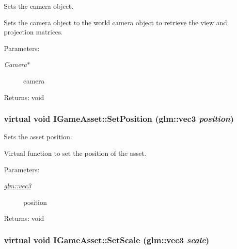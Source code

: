 Sets the camera object. 

Sets the camera object to the world camera object to retrieve the view and projection matrices.

\begin{Desc}
\item[Parameters:]
\begin{description}
\item[{\em Camera$\ast$}]camera \end{description}
\end{Desc}
\begin{Desc}
\item[Returns:]void \end{Desc}
\hypertarget{class_i_game_asset_2e98161443bb490819d97991f4dc662f}{
\subsubsection[SetPosition]{\setlength{\rightskip}{0pt plus 5cm}virtual void IGameAsset::SetPosition ({\bf glm::vec3} {\em position})}}
\label{class_i_game_asset_2e98161443bb490819d97991f4dc662f}


Sets the asset position. 

Virtual function to set the position of the asset.

\begin{Desc}
\item[Parameters:]
\begin{description}
\item[{\em \hyperlink{group__core__types_g1c47e8b3386109bc992b6c48e91b0be7}{glm::vec3}}]position \end{description}
\end{Desc}
\begin{Desc}
\item[Returns:]void \end{Desc}
\hypertarget{class_i_game_asset_bfda4878867c08bc8087c8fbe7336e54}{
\subsubsection[SetScale]{\setlength{\rightskip}{0pt plus 5cm}virtual void IGameAsset::SetScale ({\bf glm::vec3} {\em scale})}}
\label{class_i_game_asset_bfda4878867c08bc8087c8fbe7336e54}


